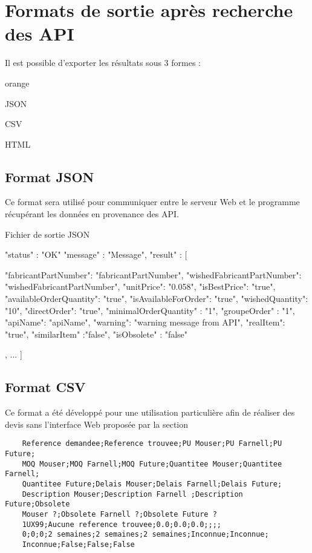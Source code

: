 \section{Formats de sortie après recherche des API}

Il est possible d'exporter les résultats sous 3 formes : 

\begin{items}{orange}{\Triangle}
\item JSON
\item CSV
\item HTML
\end{items}

\subsection{Format JSON}

Ce format sera utilisé pour communiquer entre le serveur Web et le programme récupérant les données en provenance des API.

\begin{Python}{Fichier de sortie JSON}

{
    "status" : "OK"
    "message" : "Message",
    "result" : 
    [{
        "fabricantPartNumber": "fabricantPartNumber",
        "wishedFabricantPartNumber": "wishedFabricantPartNumber",
        "unitPrice": "0.058",
        "isBestPrice": "true",
        "availableOrderQuantity": "true",
        "isAvailableForOrder": "true",
        "wishedQuantity": "10",
        "directOrder": "true",
        "minimalOrderQuantity" : "1",
        "groupeOrder" : "1",
        "apiName": "apiName",
        "warning": "warning message from API",
        "realItem": "true",
        "similarItem" :"false",
        "isObsolete" : "false"
    
    },
    {...}
    ]
}

\end{Python}

\subsection{Format CSV}

Ce format a été développé pour une utilisation particulière afin de réaliser des devis sans l'interface Web proposée par la section 

\begin{verbatim}
    Reference demandee;Reference trouvee;PU Mouser;PU Farnell;PU Future;
    MOQ Mouser;MOQ Farnell;MOQ Future;Quantitee Mouser;Quantitee Farnell;
    Quantitee Future;Delais Mouser;Delais Farnell;Delais Future;
    Description Mouser;Description Farnell ;Description Future;Obsolete
    Mouser ?;Obsolete Farnell ?;Obsolete Future ?
    1UX99;Aucune reference trouvee;0.0;0.0;0.0;;;;
    0;0;0;2 semaines;2 semaines;2 semaines;Inconnue;Inconnue;
    Inconnue;False;False;False

\end{verbatim}



